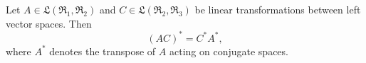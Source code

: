 Let $A \in \mathfrak{L}(\mathfrak{R}_1, \mathfrak{R}_2)$ and $C \in \mathfrak{L}(\mathfrak{R}_2, \mathfrak{R}_3)$ be linear transformations between left vector spaces. Then
$$
(AC)^* = C^* A^*,
$$
where $A^*$ denotes the transpose of $A$ acting on conjugate spaces.
